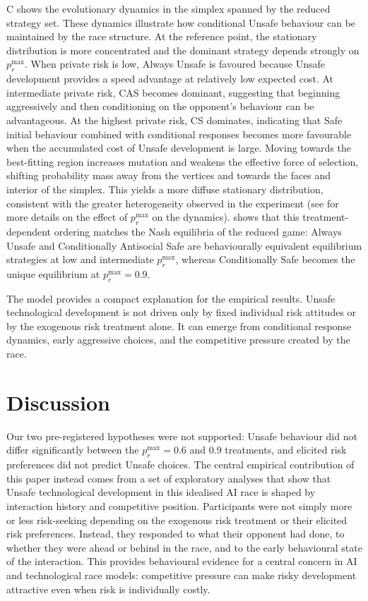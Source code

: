 \documentclass[pdflatex,sn-mathphys-ay]{sn-jnl}
\theoremstyle{thmstyleone}
\theoremstyle{thmstyletwo}
\theoremstyle{thmstylethree}
\begin{document}
C shows the evolutionary dynamics in the simplex spanned by the reduced strategy set. These dynamics illustrate how conditional Unsafe behaviour can be maintained by the race structure. At the reference point, the stationary distribution is more concentrated and the dominant strategy depends strongly on $p_r^{\max}$. When private risk is low, Always Unsafe is favoured because Unsafe development provides a speed advantage at relatively low expected cost. At intermediate private risk, CAS becomes dominant, suggesting that beginning aggressively and then conditioning on the opponent's behaviour can be advantageous. At the highest private risk, CS dominates, indicating that Safe initial behaviour combined with conditional responses becomes more favourable when the accumulated cost of Unsafe development is large. Moving towards the best-fitting region increases mutation and weakens the effective force of selection, shifting probability mass away from the vertices and towards the faces and interior of the simplex. This yields a more diffuse stationary distribution, consistent with the greater heterogeneity observed in the experiment (see  for more details on the effect of $p_r^{\max}$ on the dynamics).  shows that this treatment-dependent ordering matches the Nash equilibria of the reduced game: Always Unsafe and Conditionally Antisocial Safe are behaviourally equivalent equilibrium strategies at low and intermediate $p_r^{\max}$, whereas Conditionally Safe becomes the unique equilibrium at $p_r^{\max}=0.9$.

The model provides a compact explanation for the empirical results. Unsafe technological development is not driven only by fixed individual risk attitudes or by the exogenous risk treatment alone. It can emerge from conditional response dynamics, early aggressive choices, and the competitive pressure created by the race.

\section{Discussion}\label{sec:discussion}

Our two pre-registered hypotheses were not supported: Unsafe behaviour did not differ significantly between the $p_r^{\max}=0.6$ and $0.9$ treatments, and elicited risk preferences did not predict Unsafe choices. The central empirical contribution of this paper instead comes from a set of exploratory analyses that show that Unsafe technological development in this idealised AI race is shaped by interaction history and competitive position. Participants were not simply more or less risk-seeking depending on the exogenous risk treatment or their elicited risk preferences. Instead, they responded to what their opponent had done, to whether they were ahead or behind in the race, and to the early behavioural state of the interaction. This provides behavioural evidence for a central concern in AI and technological race models: competitive pressure can make risky development attractive even when risk is individually costly.
\end{document}

